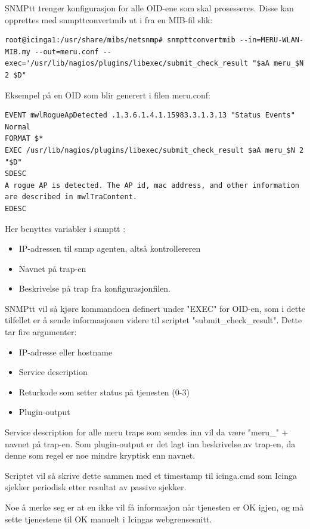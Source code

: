 SNMPtt trenger konfigurasjon for alle OID-ene som skal prosesseres. Disse kan opprettes med snmpttconvertmib ut i fra en MIB-fil slik:

\begin{lstlisting}
root@icinga1:/usr/share/mibs/netsnmp# snmpttconvertmib --in=MERU-WLAN-MIB.my --out=meru.conf --exec='/usr/lib/nagios/plugins/libexec/submit_check_result "$aA meru_$N 2 $D"
\end{lstlisting}

Eksempel på en OID som blir generert i filen meru.conf:

\begin{lstlisting}
EVENT mwlRogueApDetected .1.3.6.1.4.1.15983.3.1.3.13 "Status Events" Normal
FORMAT $*
EXEC /usr/lib/nagios/plugins/libexec/submit_check_result $aA meru_$N 2 "$D"
SDESC
A rogue AP is detected. The AP id, mac address, and other information are described in mwlTraContent.
EDESC
\end{lstlisting}

Her benyttes variabler i snmptt \cite{snmptrans}:
\begin{itemize}
	\item IP-adressen til snmp agenten, altså kontrollereren
	\item Navnet på trap-en
	\item Beskrivelse på trap fra konfigurasjonfilen.
\end{itemize}

SNMPtt vil så kjøre kommandoen definert under "EXEC" for OID-en, som i dette tilfellet er å sende informasjonen videre til scriptet "submit\_check\_result". Dette tar fire argumenter:

\begin{itemize}
	\item IP-adresse eller hostname 
	\item Service description
	\item Returkode som setter status på tjenesten (0-3)
	\item Plugin-output
\end{itemize}

Service description for alle meru traps som sendes inn vil da være "meru\_" + navnet på trap-en. Som plugin-output er det lagt inn beskrivelse av trap-en, da denne som regel er noe mindre kryptisk enn navnet.

Scriptet vil så skrive dette sammen med et timestamp til icinga.cmd som Icinga sjekker periodisk etter resultat av passive sjekker.

Noe å merke seg er at en ikke vil få informasjon når tjenesten er OK igjen, og må sette tjenestene til OK manuelt i Icingas webgrensesnitt.

